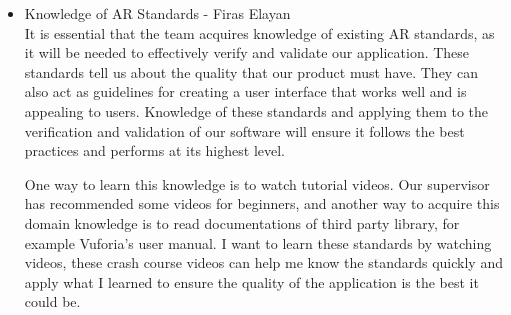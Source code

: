 \documentclass[12pt, titlepage]{article}
\begin{document}
\begin{itemize}

  \item Knowledge of AR Standards - Firas Elayan \\

  It is essential that the team acquires knowledge of existing AR standards, as it will be needed to effectively verify and validate our application. These standards tell us about the quality that our product must have. They can also act as guidelines for creating a user interface that works well and is appealing to users. Knowledge of these standards and applying them to the verification and validation of our software will ensure it follows the best practices and performs at its highest level.
  
  One way to learn this knowledge is to watch tutorial videos. Our supervisor has recommended some videos for beginners, and another way to acquire this domain knowledge is to read documentations of third party library, for example Vuforia's user manual. I want to learn these standards by watching videos, these crash course videos can help me know the standards quickly and apply what I learned to ensure the quality of the application is the best it could be.\\\\

\end{itemize}
\end{document}
